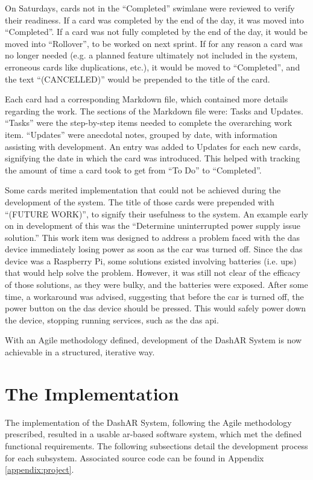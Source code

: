    \par On Saturdays, cards not in the ``Completed'' swimlane were reviewed to verify their readiness. If a card was completed by the end of the day, it was moved into ``Completed''. If a card was not fully completed by the end of the day, it would be moved into ``Rollover'', to be worked on next sprint. If for any reason a card was no longer needed (e.g. a planned feature ultimately not included in the system, erroneous cards like duplications, etc.), it would be moved to ``Completed'', and the text ``(CANCELLED)'' would be prepended to the title of the card.

    \par Each card had a corresponding Markdown file, which contained more details regarding the work. The sections of the Markdown file were: Tasks and Updates. ``Tasks'' were the step-by-step items needed to complete the overarching work item. ``Updates'' were anecdotal notes, grouped by date, with information assisting with development. An entry was added to Updates for each new cards, signifying the date in which the card was introduced. This helped with tracking the amount of time a card took to get from ``To Do'' to ``Completed''.

    \par Some cards merited implementation that could not be achieved during the development of the system. The title of those cards were prepended with ``(FUTURE WORK)'', to signify their usefulness to the system. An example early on in development of this was the ``Determine uninterrupted power supply issue solution.'' This work item was designed to address a problem faced with the \gls{das} device immediately losing power as soon as the car was turned off. Since the \gls{das} device was a Raspberry Pi, some solutions existed involving batteries (i.e. \gls{ups}) that would help solve the problem. However, it was still not clear of the efficacy of those solutions, as they were bulky, and the batteries were exposed. After some time, a workaround was advised, suggesting that before the car is turned off, the power button on the \gls{das} device should be pressed. This would safely power down the device, stopping running services, such as the \gls{das} \gls{api}.

    \par With an Agile methodology defined, development of the DashAR System is now achievable in a structured, iterative way.

\section{The Implementation}
    \par The implementation of the DashAR System, following the Agile methodology prescribed, resulted in a usable \gls{ar}-based software system, which met the defined functional requirements. The following subsections detail the development process for each subsystem. Associated source code can be found in Appendix \ref{appendix:project}.

